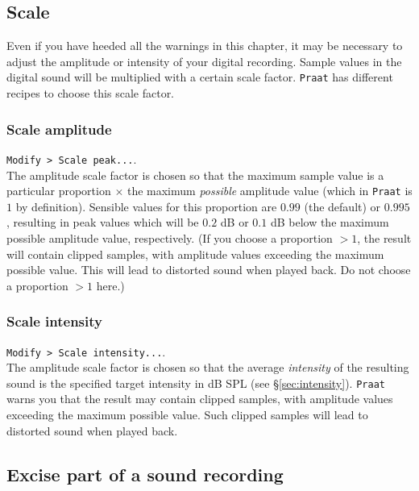 \documentclass[
]{book}
\begin{document}
\subsection{Scale}\label{scale}

Even if you have heeded all the warnings in this chapter, it may be necessary to adjust the amplitude or intensity of your digital recording. Sample values in the digital sound will be multiplied with a certain scale factor. \texttt{Praat} has different recipes to choose this scale factor.

\label{box-praatscale}
\subsubsection{Scale amplitude}\label{scale-amplitude}

\texttt{Modify\ \textgreater{}\ Scale\ peak...}.\\
The amplitude scale factor is chosen so that the maximum sample value is a particular proportion \(\times\) the maximum \emph{possible} amplitude value (which in \texttt{Praat} is \(1\) by definition). Sensible values for this proportion are \(0.99\) (the default) or \(0.995\), resulting in peak values which will be \(0.2\) dB or \(0.1\) dB below the maximum possible amplitude value, respectively. (If you choose a proportion \(>1\), the result will contain clipped samples, with amplitude values exceeding the maximum possible value. This will lead to distorted sound when played back. Do not choose a proportion \(>1\) here.)

\subsubsection{Scale intensity}\label{scale-intensity}

\texttt{Modify\ \textgreater{}\ Scale\ intensity...}.\\
The amplitude scale factor is chosen so that the average \emph{intensity} of the resulting sound is the specified target intensity in dB SPL (see §\ref{sec:intensity}). \texttt{Praat} warns you that the result may contain clipped samples, with amplitude values exceeding the maximum possible value. Such clipped samples will lead to distorted sound when played back.

\subsection{Excise part of a sound recording}\label{sec:praatsoundeditor}
\end{document}
